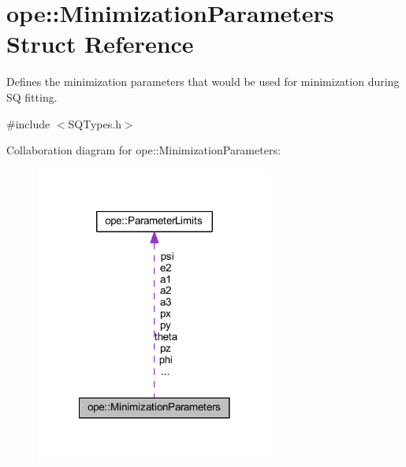 \hypertarget{structope_1_1_minimization_parameters}{\section{ope\-:\-:Minimization\-Parameters Struct Reference}
\label{structope_1_1_minimization_parameters}
}


Defines the minimization parameters that would be used for minimization during S\-Q fitting.  




{\ttfamily \#include $<$S\-Q\-Types.\-h$>$}



Collaboration diagram for ope\-:\-:Minimization\-Parameters\-:
\nopagebreak
\begin{figure}[H]
\begin{center}
\leavevmode
\includegraphics[width=222pt]{structope_1_1_minimization_parameters__coll__graph}
\end{center}
\end{figure}
